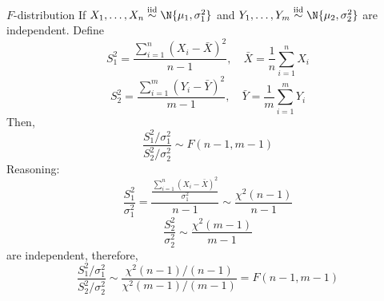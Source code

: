 \begin{Example}{$ F $-distribution}{}
    If $ X_1,\ldots,X_n \stackrel{\text{iid}}{\sim}\N{\mu_1,\sigma_1^2} $
    and $ Y_1,\ldots,Y_m \stackrel{\text{iid}}{\sim}\N{\mu_2,\sigma_2^2} $
    are independent. Define
    \[ S_1^2=\frac{\sum_{i=1}^{n} (X_i-\bar{X})^2}{n-1},\quad
        \bar{X}=\frac{1}{n} \sum_{i=1}^{n} X_i \]
    \[ S_2^2=\frac{\sum_{i=1}^{m} (Y_i-\bar{Y})^2}{m-1},\quad
        \bar{Y}=\frac{1}{m} \sum_{i=1}^{m} Y_i \]
    Then,
    \[ \frac{S_1^2/\sigma_1^2}{S_2^2/\sigma_2^2} \sim F(n-1,m-1) \]
    Reasoning:
    \[ \frac{S_1^2}{\sigma_1^2}=\frac{\displaystyle \frac{\sum_{i=1}^{n} (X_i-\bar{X})^2}{\sigma_1^2}}{
            n-1
        }\sim \frac{\chi^2(n-1)}{n-1}   \]
    \[ \frac{S_2^2}{\sigma_2^2}\sim \frac{\chi^2(m-1)}{m-1}  \]
    are independent, therefore,
    \[ \frac{S_1^2/\sigma_1^2}{S_2^2/\sigma_2^2}\sim
        \frac{\chi^2(n-1)/(n-1)}{\chi^2(m-1)/(m-1)}=F(n-1,m-1)  \]
\end{Example}
